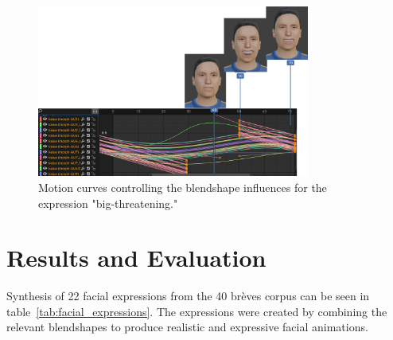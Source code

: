 \documentclass[../../main]{subfiles}
\begin{document}
\begin{figure}[h]
    \centering
    \includegraphics[width=0.8\textwidth]{chapters/facial_expressions/images/motion_curve_example.png}
    \caption{Motion curves controlling the blendshape influences for the expression "big-threatening."}
    \label{ch:facial_expressions:fig:motion_curve_example}
\end{figure}

\section{Results and Evaluation}
\label{ch:facial_expressions:results}

Synthesis of 22 facial expressions from the 40 brèves corpus can be seen in table~\ref{tab:facial_expressions}. The expressions were created by combining the relevant blendshapes to produce realistic and expressive facial animations.
\end{document}
